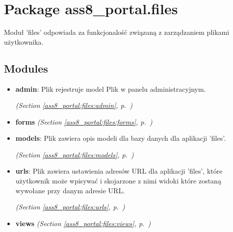 %
%
%


\section{Package ass8\_portal.files}

    \label{ass8_portal:files}
Moduł 'files' odpowiada za funkcjonalość związaną z zarządzaniem plikami 
użytkownika.



\subsection{Modules}

\begin{itemize}
\setlength{\parskip}{0ex}
\item \textbf{admin}: Plik rejestruje model Plik w panelu administracyjnym.



  \textit{(Section \ref{ass8_portal:files:admin}, p.~\pageref{ass8_portal:files:admin})}

\item \textbf{forms}
  \textit{(Section \ref{ass8_portal:files:forms}, p.~\pageref{ass8_portal:files:forms})}

\item \textbf{models}: Plik zawiera opis modeli dla bazy danych dla aplikacji 'files'.



  \textit{(Section \ref{ass8_portal:files:models}, p.~\pageref{ass8_portal:files:models})}

\item \textbf{urls}: 
Plik zawiera ustawienia adresów URL dla aplikacji 'files', 
które użytkownik może wpisywać i skojarzone z nimi widoki które zostaną wywołane przy 
danym adresie URL. 


  \textit{(Section \ref{ass8_portal:files:urls}, p.~\pageref{ass8_portal:files:urls})}

\item \textbf{views}
  \textit{(Section \ref{ass8_portal:files:views}, p.~\pageref{ass8_portal:files:views})}

\end{itemize}


